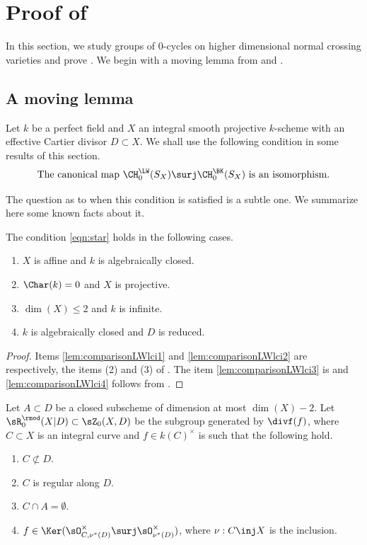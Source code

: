 \section{Proof of }
\label{sec:high-dim}
In this section, we study groups of $0$-cycles on higher
dimensional normal crossing varieties and prove .
We begin with a moving lemma from \cite{BK} and \cite{GKR}.

\subsection{A moving lemma}\label{sec:ML}
Let $k$ be a perfect field and $X$ an integral smooth projective
$k$-scheme with an effective Cartier divisor $D \subset X$.
We shall use the following condition in some results of this section.
\begin{equation}\label{eqn:star}
\mbox{The canonical map $\CH^{\LW}_0(S_X) \surj \CH_0^{\BK}(S_X)$ is an isomorphism}.
\end{equation}

The question as to when this condition is satisfied is a subtle one.
We summarize here some known facts about it.

\pagebreak[2]%
\begin{lem} \label{lem:comparisonLWlci}
The condition \eqref{eqn:star} holds in the following cases.
\begin{enumerate}
\item\label{lem:comparisonLWlci1} $X$ is affine and $k$ is algebraically closed.
\item\label{lem:comparisonLWlci2} $\Char(k)=0$ and $X$ is projective.
\item\label{lem:comparisonLWlci3} $\dim(X)\leq 2$ and $k$ is infinite.
\item\label{lem:comparisonLWlci4} $k$ is algebraically closed and $D$ is reduced.
\end{enumerate}
\begin{proof}
Items \eqref{lem:comparisonLWlci1} and \eqref{lem:comparisonLWlci2} are respectively, the items (2) and (3) of
\cite[Th.\,3.17]{BK}. The item \eqref{lem:comparisonLWlci3} is \cite[Cor.\,7.8]{BKS} and
\eqref{lem:comparisonLWlci4} follows from \cite[Th.\,6.6]{Krishna-2}.
\end{proof}
\end{lem}

Let $A \subset D$ be a closed subscheme of dimension
at most $\dim(X) - 2$.
Let $\sR^{\rmod}_0(X|D) \subset \sZ_0(X, D)$ be the subgroup generated by
$\divf(f)$, where $C \subset X$ is an integral curve
and $f \in k(C)^{\times}$ is such that the following hold.
\begin{enumerate}
\item
$C \not\subset D$.
\item
$C$ is regular along $D$.
\item
$C \cap A = \emptyset$.
\item
$f \in \Ker(\sO^{\times}_{C,\nu^*(D)} \surj \sO^{\times}_{\nu^*(D)})$, where
$\nu: C \inj X$ is the inclusion.
\end{enumerate}

